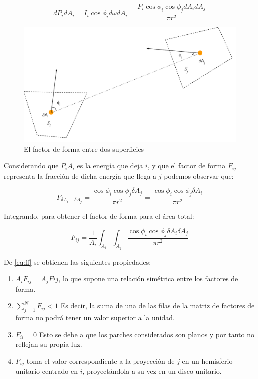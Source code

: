 \begin{equation}
    d{P}_{i}d{A_{i}} = I_{i} \cos{\phi_{i}}d{\omega}d{A_{i}} = \frac{P_{i}\cos{\phi_{i}}\cos{\phi_{j}}d{A_{i}}d{A_{j}}}{\pi r^{2}}
\end{equation}

\vspace{5mm}
\begin{figure}[htbp]
	\centering
	\includegraphics[width=0.8\linewidth]{assets/ff}
	\caption{El factor de forma entre dos superficies}
	\label{img:ff2}
\end{figure}


Considerando que ${P}_{i}{A_{i}}$ es la energía que deja $i$, y que el factor de forma $F_{ij}$ representa la fracción de dicha energía que llega a $j$ podemos observar que:

\begin{equation}
    F_{\delta{A_{i}}-\delta{A_{j}}} = \frac{\cos{\phi_{i}}\cos{\phi_{j}}\delta{A_{j}}}{\pi r^{2}} = \frac{\cos{\phi_{i}}\cos{\phi_{j}}\delta{A_{i}}}{\pi{r^{2}}}
\end{equation}

Integrando, para obtener el factor de forma para el área total:

\begin{equation}
    F_{ij} = \frac{1}{A_{i}} \int_{A_{i}}\int_{A_{j}}\frac{\cos{\phi_{i}}\cos{\phi_{j}}\delta{A_{i}}\delta{A_{j}}}{\pi{r^{2}}} \label{eq:ff}    
\end{equation}

De \eqref{eq:ff} se obtienen las siguientes propiedades:
\begin{enumerate}
	\label{propsff}
    \item $A_{i}F_{ij} = A_{j}F{ij}$, lo que supone una relación simétrica entre los factores de forma.
    \item $\sum_{j=1}^{N} F_{ij} < 1$ Es decir, la suma de una de las filas de la matriz de factores de forma no podrá tener un valor superior a la unidad.
    \item $F_{ii} = 0$ Esto se debe a que los parches considerados son planos y por tanto no reflejan su propia luz.
    \item $F_{ij}$ toma el valor correspondiente a la proyección de $j$ en un hemisferio unitario centrado en $i$, proyectándola a su vez en un disco unitario.
\end{enumerate}


